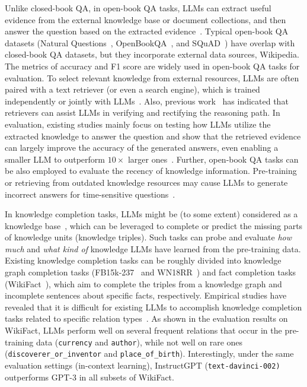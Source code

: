 Unlike closed-book QA, in open-book QA tasks, LLMs can extract useful evidence from the external knowledge base or document collections,  and then answer the question based on the extracted evidence~\cite{Izacard-arxiv-2022-Few, Guu-ICML-2020-Retrieval, Lewis-NeurIPS-2020-Retrieval,Lan-2021-arxiv-Complex}. 
{Typical open-book QA datasets (\eg Natural Questions~\cite{Kwiatkowski-ACL-2019-Natural}, OpenBookQA~\cite{Mihaylov-EMNLP-2018-Can}, and SQuAD~\cite{Rajpurkar-EMNLP-2016-SQuAD}) have overlap with closed-book QA datasets, but they incorporate external data sources, \eg Wikipedia.
The metrics of accuracy and F1 score  are widely used in open-book QA tasks for evaluation.}
To select relevant knowledge from external resources, LLMs are often paired with a text retriever (or even a  search engine), which is trained independently or jointly with LLMs~\cite{Izacard-arxiv-2022-Few,Borgeaud-icml-2022-Improving,Nakano-arxiv-2021-WebGPT}. 
{
Also, previous work~\cite{Xu-arxiv-2023-Search,Peng-arxiv-2023-Check,Jiang-2023-arxiv-Active} has indicated that retrievers can  assist LLMs in verifying and rectifying the reasoning path.
}
In evaluation, existing studies mainly focus on testing how LLMs utilize the extracted knowledge to answer the question and show that the retrieved evidence can largely improve the accuracy of the generated answers, even enabling a smaller LLM to outperform $10\times$ larger ones~\cite{Izacard-arxiv-2022-Few,Borgeaud-icml-2022-Improving}.
Further, open-book QA tasks can be also employed to evaluate the recency of  knowledge information. 
Pre-training or retrieving from outdated knowledge resources may cause LLMs to generate incorrect answers for time-sensitive  questions~\cite{Izacard-arxiv-2022-Few}.


In knowledge completion tasks, LLMs might be (to some extent) considered as a knowledge base~\cite{Petroni-EMNLP-2019-Language}, which can be leveraged to complete or predict the missing parts of knowledge units (\eg knowledge triples).
Such tasks can probe and evaluate \emph{how much} and \emph{what kind of} knowledge LLMs have learned from the pre-training data.
Existing knowledge completion tasks can be roughly divided into knowledge graph completion tasks (\eg FB15k-237~\cite{Toutanova-CVSC-2015-Observed} and  WN18RR~\cite{Dettmers-AAAI-2018-Convolutional}) and fact completion tasks (\eg WikiFact~\cite{Goodrich-KDD-2019-Assessing}), which aim to complete the triples from a knowledge graph and incomplete sentences about specific facts, respectively. 
Empirical studies have revealed that it is difficult for existing LLMs to accomplish knowledge completion tasks {related to specific relation types~\cite{Liang-arxiv-2022-Holistic}.}
As shown in the evaluation results on WikiFact, LLMs perform well on several frequent relations that occur in the pre-training data (\eg \texttt{currency} and \texttt{author}), while not well on rare ones (\eg \texttt{discoverer\_or\_inventor} and \texttt{place\_of\_birth}). 
Interestingly, %
{under the same evaluation settings (\eg in-context learning), InstructGPT (\ie \texttt{text-davinci-002)}} outperforms GPT-3 in all subsets of WikiFact.

